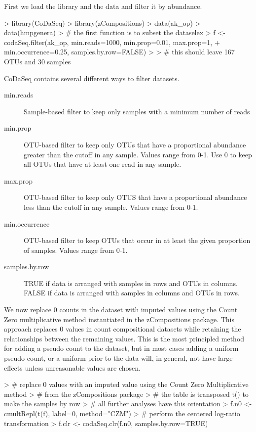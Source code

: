 \documentclass[11pt]{article}
\begin{document}
First we load the library and the data and filter it by abundance.

\begin{Schunk}
\begin{Sinput}
> library(CoDaSeq)
> library(zCompositions)
> data(ak_op)
> data(hmpgenera)
> # the first function is to subset the dataselex
> f <- codaSeq.filter(ak_op, min.reads=1000, min.prop=0.01, max.prop=1,
+     min.occurrence=0.25, samples.by.row=FALSE)
> 
> # this should leave 167 OTUs and 30 samples
\end{Sinput}
\end{Schunk}

CoDaSeq contains several different ways to filter datasets.

\begin{description}
\item[min.reads] Sample-based filter to keep only samples with a minimum number of reads
\item[min.prop] OTU-based filter to keep only OTUs that have a proportional abundance greater than the cutoff in any sample. Values range from 0-1. Use 0 to keep all OTUs that have at least one read in any sample.
\item[max.prop] OTU-based filter to keep only OTUS that have a proportional abundance less than the cutoff in any sample. Values range from 0-1.
\item[min.occurrence] OTU-based filter to keep OTUs that occur in at least the given proportion of samples. Values range from 0-1.
\item[samples.by.row] TRUE if data is arranged with samples in rows and OTUs in columns. FALSE if data is arranged with samples in columns and OTUs in rows.
\end{description}

We now replace 0 counts in the dataset with imputed values using the Count Zero multiplicative method instantiated in the zCompositions package. This approach replaces 0 values in count compositional datasets while retaining the relationships between the remaining values. This is the most principled method for adding a pseudo count to the dataset, but in most cases adding a uniform pseudo count, or a uniform prior to the data will, in general, not have large effects unless unreasonable values are chosen.

\begin{Schunk}
\begin{Sinput}
> # replace 0 values with an imputed value using the Count Zero Multiplicative method
> # from the zCompositions package
> # the table is transposed t() to make the samples by row
> # all further analyses have this orientation
> f.n0 <- cmultRepl(t(f), label=0, method="CZM")
> # perform the centered log-ratio transformation
> f.clr <- codaSeq.clr(f.n0, samples.by.row=TRUE)
\end{Sinput}
\end{Schunk}
\end{document}
